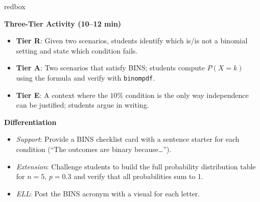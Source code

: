 \documentclass[10pt]{article}
\begin{document}
\begin{skillbox}{redbox}
\begin{minipage}[t]{0.48\linewidth}
    \textbf{Three-Tier Activity (10--12 min)}
    \begin{itemize}
        \item \textbf{Tier R}: Given two scenarios, students identify which is/is not
              a binomial setting and state which condition fails.
        \item \textbf{Tier A}: Two scenarios that satisfy BINS; students compute
              $P(X = k)$ using the formula and verify with \texttt{binompdf}.
        \item \textbf{Tier E}: A context where the $10\%$ condition is the only way
              independence can be justified; students argue in writing.
    \end{itemize}
\end{minipage}
\hfill
\begin{minipage}[t]{0.48\linewidth}
    \textbf{Differentiation}
    \begin{itemize}
        \item \textit{Support}: Provide a BINS checklist card with a sentence starter
              for each condition (``The outcomes are binary because\ldots'').
        \item \textit{Extension}: Challenge students to build the full probability
              distribution table for $n = 5$, $p = 0.3$ and verify that all
              probabilities sum to 1.
        \item \textit{ELL}: Post the BINS acronym with a visual for each letter.
    \end{itemize}
\end{minipage}
\end{skillbox}
\end{document}
